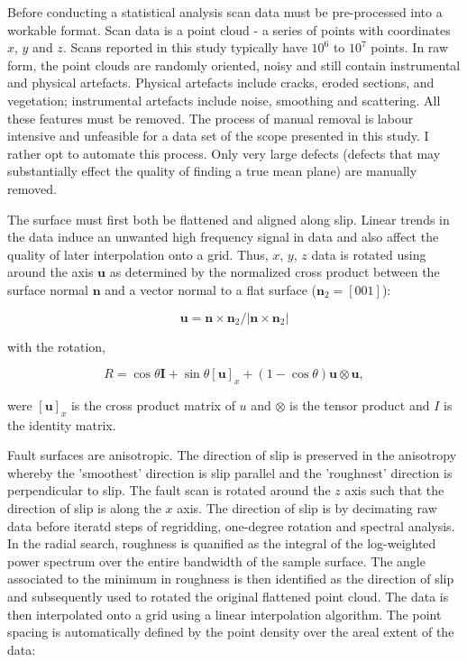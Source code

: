 \documentclass[12pt,a4paper]{article}
\begin{document}
Before conducting a statistical analysis scan data must be pre-processed into a workable format. Scan data is a point cloud - a series of points with coordinates $x$, $y$ and $z$. Scans reported in this study typically have $10^6$ to $ 10^7$ points. In raw form, the point clouds are randomly oriented, noisy and still contain instrumental and physical artefacts. Physical artefacts include cracks, eroded sections, and vegetation; instrumental artefacts include noise, smoothing and scattering. All these features must be removed. The process of manual removal is labour intensive and unfeasible for a data set of the scope presented in this study. I rather opt to automate this process. Only very large defects (defects that may substantially effect the quality of finding a true mean plane) are manually removed.

The surface must first both be flattened and aligned along slip. Linear trends in the data induce an unwanted high frequency signal in data and also affect the quality of later interpolation onto a grid. Thus, $x$, $y$, $z$ data is rotated using around the axis $\textbf{u}$ as determined by the normalized cross product between the surface normal $\textbf{n}$ and a vector normal to a flat surface ($\textbf{n}_2 = [0 0 1]$): 

$$ \textbf{u} = {\textbf{n}\times\textbf{n}_2}/{|{\textbf{n}\times\textbf{n}_2}|} $$

with the rotation,

$$ R = \cos\theta\textbf{I} + \sin\theta[\textbf{u}]_x+(1-\cos\theta)\textbf{u}\otimes\textbf{u},$$

were $[\textbf{u}]_x$ is the cross product matrix of $u$ and $\otimes$ is the tensor product and $I$ is the identity matrix.

Fault surfaces are anisotropic. The direction of slip is preserved in the anisotropy whereby the 'smoothest' direction is slip parallel and the 'roughnest' direction is perpendicular to slip. The fault scan is rotated around the $z$ axis such that the direction of slip is along the $x$ axis. The direction of slip is by decimating raw data before iteratd steps of regridding, one-degree rotation and spectral analysis. In the radial search, roughness is quanified as the integral of the log-weighted power spectrum over the entire bandwidth of the sample surface. The angle associated to the minimum in roughness is then identified as the direction of slip and subsequently used to rotated the original flattened point cloud. The data is then interpolated onto a grid using a linear interpolation algorithm. The point spacing is automatically defined by the point density over the areal extent of the data:
\end{document}
